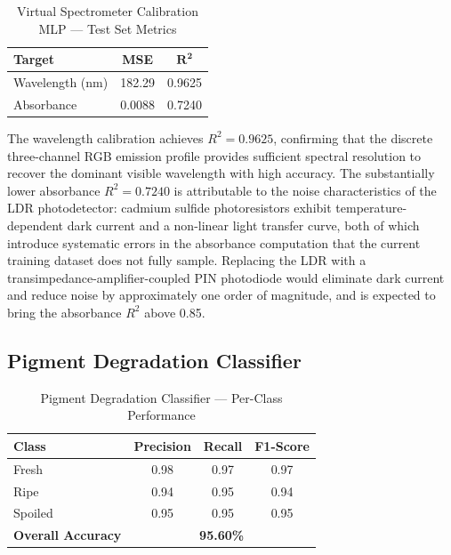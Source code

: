 \documentclass{ieeeaccess}
\begin{document}
\begin{table}[t]
\renewcommand{\arraystretch}{1.3}
\centering
\caption{Virtual Spectrometer Calibration MLP --- Test Set Metrics}
\label{tab:cal_results}
\begin{tabular}{lcc}
\toprule
\textbf{Target} & \textbf{MSE} & $\boldsymbol{R}^{\boldsymbol{2}}$ \\
\midrule
Wavelength (nm) & 182.29 & 0.9625 \\
Absorbance      & 0.0088 & 0.7240 \\
\bottomrule
\end{tabular}
\end{table}

The wavelength calibration achieves $R^2 = 0.9625$, confirming that the discrete three-channel RGB emission profile provides sufficient spectral resolution to recover the dominant visible wavelength with high accuracy. The substantially lower absorbance $R^2 = 0.7240$ is attributable to the noise characteristics of the LDR photodetector: cadmium sulfide photoresistors exhibit temperature-dependent dark current and a non-linear light transfer curve, both of which introduce systematic errors in the absorbance computation that the current training dataset does not fully sample. Replacing the LDR with a transimpedance-amplifier-coupled PIN photodiode would eliminate dark current and reduce noise by approximately one order of magnitude, and is expected to bring the absorbance $R^2$ above 0.85.

\subsection{Pigment Degradation Classifier}

\begin{table}[t]
\renewcommand{\arraystretch}{1.3}
\centering
\caption{Pigment Degradation Classifier --- Per-Class Performance}
\label{tab:pigment_results}
\begin{tabular}{lccc}
\toprule
\textbf{Class} & \textbf{Precision} & \textbf{Recall} & \textbf{F1-Score} \\
\midrule
Fresh   & 0.98 & 0.97 & 0.97 \\
Ripe    & 0.94 & 0.95 & 0.94 \\
Spoiled & 0.95 & 0.95 & 0.95 \\
\midrule
\textbf{Overall Accuracy} & \multicolumn{3}{c}{\textbf{95.60\%}} \\
\bottomrule
\end{tabular}
\end{table}
\end{document}
